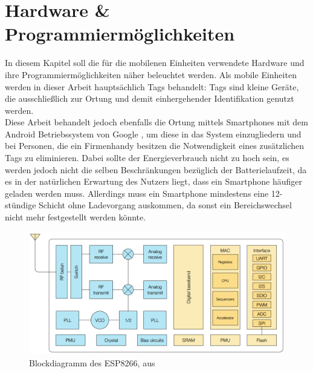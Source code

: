 \chapter{Hardware \& Programmiermöglichkeiten}
\label{ch:hardprog}
In diesem Kapitel soll die für die mobilenen Einheiten verwendete Hardware und ihre Programmiermöglichkeiten näher beleuchtet werden.
Als mobile Einheiten werden in dieser Arbeit hauptsächlich Tags behandelt: Tags sind kleine Geräte, die ausschließlich zur Ortung und demit einhergehender Identifikation genutzt werden.\\
Diese Arbeit behandelt jedoch ebenfalls die Ortung mittels Smartphones mit dem Android Betriebssystem von Google \cite{google2017android}, um diese in das System einzugliedern und bei Personen, die ein Firmenhandy besitzen die Notwendigkeit eines zusätzlichen Tags zu eliminieren.
Dabei sollte der Energieverbrauch nicht zu hoch sein, es werden jedoch nicht die selben Beschränkungen bezüglich der Batterielaufzeit, da es in der natürlichen Erwartung des Nutzers liegt, dass ein Smartphone häufiger geladen werden muss.
Allerdings muss ein Smartphone mindestens eine 12-stündige Schicht ohne Ladevorgang auskommen, da sonst ein Bereichswechsel nicht mehr festgestellt werden könnte.

\begin{figure}[h]
  \centering
	\includegraphics[width=\textwidth]{images/espblock.png}
  \caption{Blockdiagramm des ESP8266, aus \cite{espressif2017esp8266}}
  \label{fig:espblock}
\end{figure}

